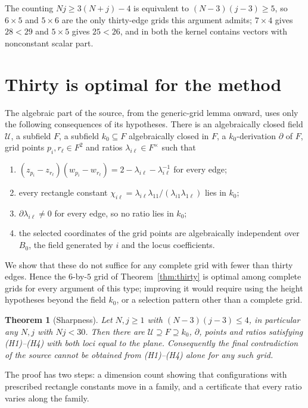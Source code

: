 \documentclass[11pt]{article}
\newtheorem{theorem}{Theorem}
\theoremstyle{remark}
\begin{document}
The counting $Nj\ge3(N+j)-4$ is equivalent to $(N-3)(j-3)\ge5$, so
$6\times5$ and $5\times6$ are the only thirty-edge grids this
argument admits; $7\times4$ gives $28<29$ and $5\times5$ gives $25<26$,
and in both the kernel contains vectors with nonconstant scalar part.

\section{Thirty is optimal for the method}
\label{sec:sharp}
The algebraic part of the source, from the generic-grid lemma onward,
uses only the following consequences of its hypotheses. There is an
algebraically closed field $\mathcal U$, a subfield $F$, a subfield
$k_0\subseteq F$ algebraically closed in $F$, a $k_0$-derivation
$\partial$ of $F$, grid points $p_i,r_\ell\in F^2$ and ratios
$\lambda_{i\ell}\in F^\times$ such that
\begin{enumerate}
\item[(H1)] $(z_{p_i}-z_{r_\ell})(w_{p_i}-w_{r_\ell})
   =2-\lambda_{i\ell}-\lambda_{i\ell}^{-1}$ for every edge;
\item[(H2)] every rectangle constant
   $\chi_{i\ell}=\lambda_{i\ell}\lambda_{11}/(\lambda_{i1}\lambda_{1\ell})$
   lies in $k_0$;
\item[(H3)] $\partial\lambda_{i\ell}\ne0$ for every edge, so no ratio
   lies in $k_0$;
\item[(H4)] the selected coordinates of the grid points are
   algebraically independent over $B_0$, the field generated by $i$
   and the locus coefficients.
\end{enumerate}
We show that these do not suffice for any complete grid with fewer
than thirty edges. Hence the $6$-by-$5$ grid of Theorem~\ref{thm:thirty}
is optimal among complete grids for every argument of this type;
improving it would require using the height hypotheses beyond the
field $k_0$, or a selection pattern other than a complete grid.

\begin{theorem}[Sharpness]
\label{thm:sharp}
Let $N,j\ge1$ with $(N-3)(j-3)\le4$, in particular any $N,j$ with
$Nj<30$. Then there are $\mathcal U\supseteq F\supseteq k_0$,
$\partial$, points and ratios satisfying (H1)--(H4) with both loci
equal to the plane. Consequently the final contradiction of the source
cannot be obtained from (H1)--(H4) alone for any such grid.
\end{theorem}

The proof has two steps: a dimension count showing that configurations
with prescribed rectangle constants move in a family, and a
certificate that every ratio varies along the family.
\end{document}

